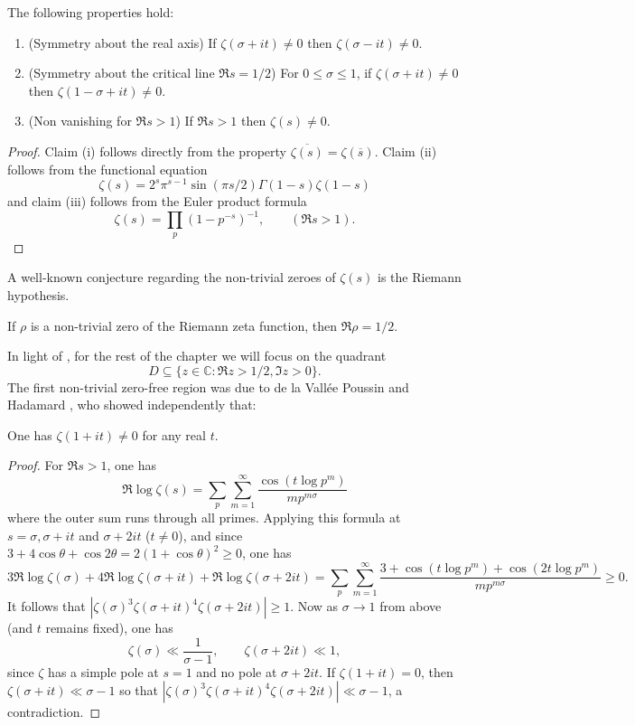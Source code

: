 \begin{lemma}\label{zero-free-basic-lem}
The following properties hold:
\begin{enumerate}
    \item[(i)] (Symmetry about the real axis) If $\zeta(\sigma + it) \ne 0$ then $\zeta(\sigma - it) \ne 0$.
    \item[(ii)] (Symmetry about the critical line $\Re s = 1/2$) For $0 \le \sigma \le 1$, if $\zeta(\sigma + it) \ne 0$ then $\zeta(1 - \sigma + it) \ne 0$.
    \item[(iii)] (Non vanishing for $\Re s > 1$) If $\Re s > 1$ then $\zeta(s) \ne 0$.
\end{enumerate}
\end{lemma}
\begin{proof}
Claim (i) follows directly from the property $\overline{\zeta(s)} = \zeta(\overline{s})$. Claim (ii) follows from the functional equation
\[
\zeta(s) = 2^s \pi^{s - 1}\sin(\pi s/2) \Gamma(1 -s)\zeta(1-s)
\]
and claim (iii) follows from the Euler product formula
\[
\zeta(s) = \prod_{p}(1 - p^{-s})^{-1},\qquad (\Re s > 1).
\]
\end{proof}

A well-known conjecture regarding the non-trivial zeroes of $\zeta(s)$ is the Riemann hypothesis.

\begin{conjecture}\label{rh}
If $\rho$ is a non-trivial zero of the Riemann zeta function, then $\Re \rho = 1/2$.
\end{conjecture}


In light of , for the rest of the chapter we will focus on the quadrant
\[
D\subseteq \{z \in \mathbb{C}: \Re z > 1/2, \Im z > 0\}.
\]
The first non-trivial zero-free region was due to de la Vall\'ee Poussin \cite{de_la_vallee_poussin_recherches_1896} and Hadamard \cite{hadamard_distribution_1896}, who showed independently that:


\begin{theorem}
One has $\zeta(1 + it) \ne 0$ for any real $t$.
\end{theorem}
\begin{proof}
For $\Re s > 1$, one has
\[
\Re \log \zeta(s) = \sum_{p}\sum_{m = 1}^{\infty}\frac{\cos (t \log p^m)}{mp^{m\sigma}}
\]
where the outer sum runs through all primes. Applying this formula at $s = \sigma, \sigma + it$ and $\sigma + 2it$ ($t \ne 0$), and since $3 + 4\cos\theta + \cos 2\theta = 2(1 + \cos\theta)^2 \ge 0$, one has
\[
3\Re \log \zeta(\sigma) + 4\Re \log \zeta(\sigma + it) + \Re\log \zeta(\sigma + 2it) = \sum_{p}\sum_{m = 1}^{\infty}\frac{3 + \cos (t \log p^m) + \cos (2t\log p^m)}{mp^{m\sigma}} \ge 0.
\]
It follows that $|\zeta(\sigma)^3 \zeta(\sigma + it)^4 \zeta(\sigma + 2it)| \ge 1$. Now as $\sigma \to 1$ from above (and $t$ remains fixed), one has
\[
\zeta(\sigma) \ll \frac{1}{\sigma - 1},\qquad \zeta(\sigma + 2it) \ll 1,
\]
since $\zeta$ has a simple pole at $s = 1$ and no pole at $\sigma + 2it$. If $\zeta(1 + it) = 0$, then $\zeta(\sigma + it) \ll \sigma - 1$ so that $|\zeta(\sigma)^3 \zeta(\sigma + it)^4 \zeta(\sigma + 2it)| \ll \sigma - 1$, a contradiction.
\end{proof}

